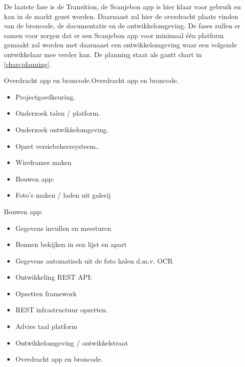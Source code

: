 \documentclass[a4paper,11pt,oneside]{report}
\begin{document}
De laatste fase is de Transition, de Scanjebon app is hier klaar voor gebruik en kan in de markt gezet worden. Daarnaast zal hier de overdracht plaats vinden van de broncode, de documentatie en de ontwikkelomgeving. De fases zullen er samen voor zorgen dat er een Scanjebon app voor minimaal één platform gemaakt zal worden met daarnaast een ontwikkelomgeving waar een volgende ontwikkelaar mee verder kan. De planning staat als gantt chart in \ref{chap:planning}.
\begin{description}
Overdracht app en broncode.Overdracht app en broncode.
  \item[Fase 1: Inception] 
    \item \mbox{}
    \begin{itemize}
      \item Projectgoedkeuring.
      \item Onderzoek talen / platform.
      \item Onderzoek ontwikkelomgeving.
    \end{itemize}
  \item[Fase 2: Elaboration]
    \item \mbox{}
    \begin{itemize}
      \item Opzet versiebeheersysteem..
      \item Wireframes maken
      \item Bouwen app:
      \item Foto’s maken / laden uit galerij
    \end{itemize}
  \item[Fase 3: Construction]
    \item \mbox{}
    Bouwen app:
    \begin{itemize}
      \item Gegevens invullen en meesturen
      \item Bonnen bekijken in een lijst en apart 
      \item Gegevens automatisch uit de foto halen d.m.v. OCR
      \item Ontwikkeling REST API:
      \item Opzetten framework
      \item REST infrastructuur opzetten.
    \end{itemize}
  \item[Fase 4: Transition] 
    \item \mbox{}
    \begin{itemize}
      \item Advies taal platform
      \item Ontwikkelomgeving / ontwikkelstraat
      \item Overdracht app en broncode.
    \end{itemize}
\end{description}
\end{document}
